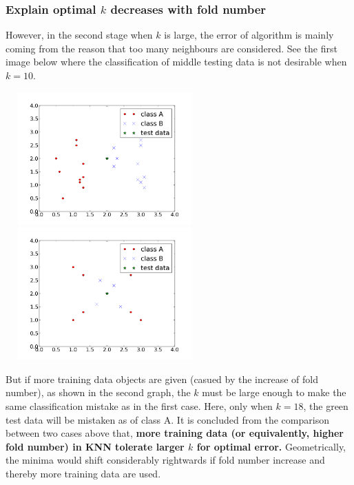 \documentclass[11pt,a4paper]{article}
\newcommand{\htab}{\hspace*{0.63cm}}
\begin{document}
\subsubsection{Explain optimal $k$ decreases with fold number}
\htab However, in the second stage when $k$ is large, the error of algorithm is mainly coming from the reason that too many neighbours are considered. See the first image below where the classification of middle testing data is not desirable when $k=10$. 
\begin{center}
\includegraphics[width=3in,height=2in]{./picture/F3.png}
\includegraphics[width=3in,height=2in]{./picture/F4.png}\\
\end{center}
\htab But if more training data objects are given (casued by the increase of fold number), as shown in the second graph, the $k$ must be large enough to make the same classification mistake as in the first case. Here, only when $k=18$, the green test data will be mistaken as of class A. It is concluded from the comparison between two cases above that, \textbf{more training data (or equivalently, higher fold number) in KNN tolerate larger $k$ for optimal error.} Geometrically, the minima would shift considerably rightwards if fold number increase and thereby more training data are used.
\newpage
\end{document}
